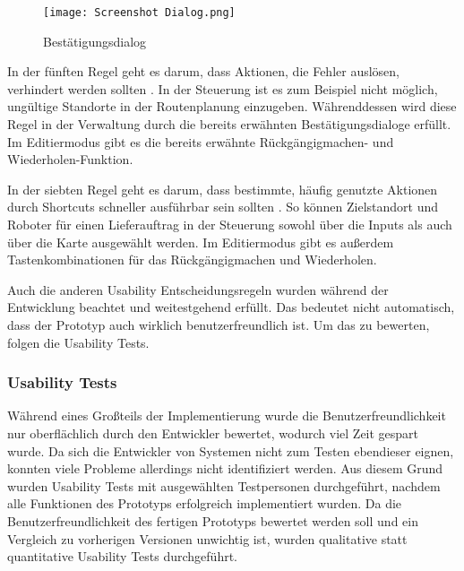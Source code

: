 \begin{figure}[H]
    \caption{Bestätigungsdialog}\label{fig:DialogScreenshot}
    \texttt{[image: Screenshot Dialog.png]}
\end{figure}

In der fünften Regel geht es darum, dass Aktionen, die Fehler auslösen, verhindert werden sollten \cite[Regel 5]{Nielsen.1994}. In der Steuerung ist es zum Beispiel nicht möglich, ungültige Standorte in der Routenplanung einzugeben. Währenddessen wird diese Regel in der Verwaltung durch die bereits erwähnten Bestätigungsdialoge erfüllt. Im Editiermodus gibt es die bereits erwähnte Rückgängigmachen- und Wiederholen-Funktion.

In der siebten Regel geht es darum, dass bestimmte, häufig genutzte Aktionen durch Shortcuts schneller ausführbar sein sollten \cite[Regel 7]{Nielsen.1994}. So können Zielstandort und Roboter für einen Lieferauftrag in der Steuerung sowohl über die Inputs als auch über die Karte ausgewählt werden. Im Editiermodus gibt es außerdem Tastenkombinationen für das Rückgängigmachen und Wiederholen.

Auch die anderen Usability Entscheidungsregeln wurden während der Entwicklung beachtet und weitestgehend erfüllt. Das bedeutet nicht automatisch, dass der Prototyp auch wirklich benutzerfreundlich ist. Um das zu bewerten, folgen die Usability Tests.

\subsubsection{Usability Tests}\label{sec:UsabilityTests}
Während eines Großteils der Implementierung wurde die Benutzerfreundlichkeit nur oberflächlich durch den Entwickler bewertet, wodurch viel Zeit gespart wurde. Da sich die Entwickler von Systemen nicht zum Testen ebendieser eignen, konnten viele Probleme allerdings nicht identifiziert werden. Aus diesem Grund wurden Usability Tests mit ausgewählten Testpersonen durchgeführt, nachdem alle Funktionen des Prototyps erfolgreich implementiert wurden. Da die Benutzerfreundlichkeit des fertigen Prototyps bewertet werden soll und ein Vergleich zu vorherigen Versionen unwichtig ist, wurden qualitative statt quantitative Usability Tests durchgeführt.

